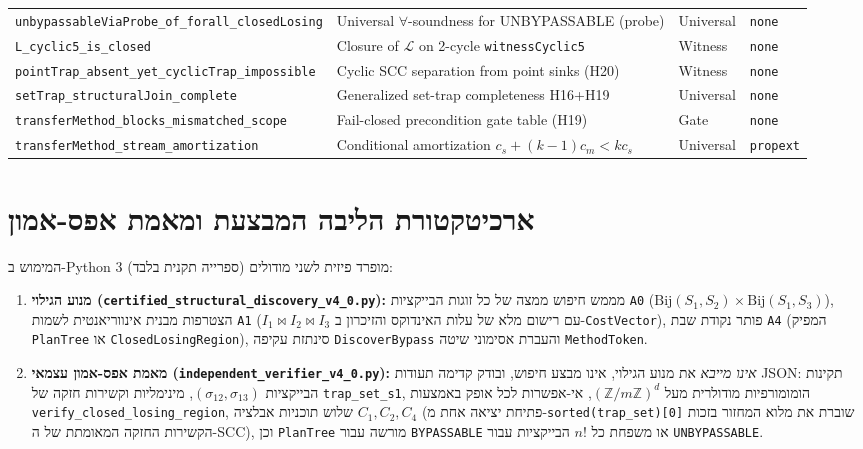 \documentclass[10pt,a4paper]{article}
\newcommand{\code}[1]{\foreignlanguage{english}{\nolinkurl{#1}}}
\newcommand{\ltr}[1]{\foreignlanguage{english}{#1}}
\begin{document}
\begin{table}[!htbp]
\begin{otherlanguage}{english}
\begin{tabularx}{\linewidth}{@{}>{\raggedright\arraybackslash}p{6.5cm}>{\raggedright\arraybackslash}Xll@{}}
\nolinkurl{unbypassableViaProbe_of_forall_closedLosing} & Universal $\forall$-soundness for UNBYPASSABLE (probe) & Universal & \nolinkurl{none} \\
\nolinkurl{L_cyclic5_is_closed} & Closure of $\mathcal{L}$ on 2-cycle \nolinkurl{witnessCyclic5} & Witness & \nolinkurl{none} \\
\nolinkurl{pointTrap_absent_yet_cyclicTrap_impossible} & Cyclic SCC separation from point sinks (H20) & Witness & \nolinkurl{none} \\
\nolinkurl{setTrap_structuralJoin_complete} & Generalized set-trap completeness H16+H19 & Universal & \nolinkurl{none} \\
\nolinkurl{transferMethod_blocks_mismatched_scope} & Fail-closed precondition gate table (H19) & Gate & \nolinkurl{none} \\
\nolinkurl{transferMethod_stream_amortization} & Conditional amortization $c_s+(k-1)c_m<kc_s$ & Universal & \nolinkurl{propext} \\
\bottomrule
\end{tabularx}
\end{otherlanguage}
\end{table}

\section{ארכיטקטורת הליבה המבצעת ומאמת אפס-אמון}

המימוש ב-\ltr{Python 3} (ספרייה תקנית בלבד) מופרד פיזית לשני מודולים:
\begin{enumerate}
\item \textbf{מנוע הגילוי (\code{certified_structural_discovery_v4_0.py}):} מממש חיפוש ממצה של כל זוגות הבייקציות \code{A0} ($\mathrm{Bij}(S_1,S_2)\times\mathrm{Bij}(S_1,S_3)$), הצטרפות מבנית אינווריאנטית לשמות \code{A1} ($I_1 \bowtie I_2 \bowtie I_3$ עם רישום מלא של עלות האינדוקס והזיכרון ב-\code{CostVector}), פותר נקודת שבת \code{A4} (המפיק \code{PlanTree} או \code{ClosedLosingRegion}), סינתזת עקיפה \code{DiscoverBypass} והעברת אסימוני שיטה \code{MethodToken}.
\item \textbf{מאמת אפס-אמון עצמאי (\code{independent_verifier_v4_0.py}):} \emph{אינו מייבא} את מנוע הגילוי, אינו מבצע חיפוש, ובודק קדימה תעודות \ltr{JSON}: תקינות הבייקציות $(\sigma_{12},\sigma_{13})$, מינימליות וקשירות חזקה של \code{trap_set_s1}, הומומורפיות מודולרית מעל $(\mathbb{Z}/m\mathbb{Z})^d$, אי-אפשרות לכל אופק באמצעות \code{verify_closed_losing_region}, שלוש תוכניות אבלציה $C_1, C_2, C_4$ (פתיחת יציאה אחת מ-\code{sorted(trap_set)[0]} שוברת את מלוא המחזור בזכות הקשירות החזקה המאומתת של ה-\ltr{SCC}), וכן \code{PlanTree} מורשה עבור \code{BYPASSABLE} או משפחת כל $n!$ הבייקציות עבור \code{UNBYPASSABLE}.
\end{enumerate}
\end{document}
